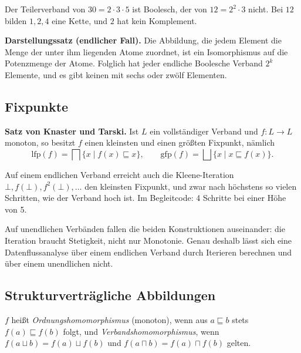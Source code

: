 \documentclass[12pt, a4paper]{article}
\begin{document}
\begin{examplebox}
Der Teilerverband von $30 = 2 \cdot 3 \cdot 5$ ist Boolesch, der von
$12 = 2^2 \cdot 3$ nicht. Bei $12$ bilden $1, 2, 4$ eine Kette, und $2$ hat
kein Komplement.
\end{examplebox}

\textbf{Darstellungssatz (endlicher Fall).} Die Abbildung, die jedem Element
die Menge der unter ihm liegenden Atome zuordnet, ist ein Isomorphismus auf
die Potenzmenge der Atome. Folglich hat jeder endliche Boolesche Verband
$2^k$ Elemente, und es gibt keinen mit sechs oder zwölf Elementen.

\subsection{Fixpunkte}

\begin{definitionbox}
\textbf{Satz von Knaster und Tarski.} Ist $L$ ein vollständiger Verband und
$f: L \to L$ monoton, so besitzt $f$ einen kleinsten und einen größten
Fixpunkt, nämlich
\[
  \mathrm{lfp}(f) = \bigsqcap \{ x \mid f(x) \sqsubseteq x \}, \qquad
  \mathrm{gfp}(f) = \bigsqcup \{ x \mid x \sqsubseteq f(x) \}.
\]
\end{definitionbox}

Auf einem endlichen Verband erreicht auch die Kleene-Iteration
$\bot, f(\bot), f^2(\bot), \dots$ den kleinsten Fixpunkt, und zwar nach
höchstens so vielen Schritten, wie der Verband hoch ist. Im Begleitcode:
4 Schritte bei einer Höhe von 5.

\begin{notebox}
Auf unendlichen Verbänden fallen die beiden Konstruktionen auseinander: die
Iteration braucht Stetigkeit, nicht nur Monotonie. Genau deshalb lässt sich
eine Datenflussanalyse über einem endlichen Verband durch Iterieren
berechnen und über einem unendlichen nicht.
\end{notebox}

\subsection{Strukturverträgliche Abbildungen}

\begin{definitionbox}
$f$ heißt \emph{Ordnungshomomorphismus} (monoton), wenn aus
$a \sqsubseteq b$ stets $f(a) \sqsubseteq f(b)$ folgt, und
\emph{Verbandshomomorphismus}, wenn $f(a \sqcup b) = f(a) \sqcup f(b)$ und
$f(a \sqcap b) = f(a) \sqcap f(b)$ gelten.
\end{definitionbox}
\end{document}
